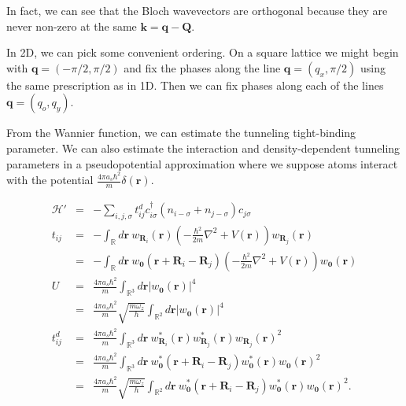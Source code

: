 \documentclass{article}
\theoremstyle{definition}
\begin{document}
 In fact, we can see that the Bloch wavevectors are orthogonal because they are never non-zero at the same $\mathbf{k} = \mathbf{q} - \mathbf{Q}$.
 
In 2D, we can pick some convenient ordering. On a square lattice we might begin with $\mathbf{q} = (-\pi/2, \pi/2)$ and fix the phases along the line $\mathbf{q} = (q_x, \pi/2)$ using the same prescription as in 1D. Then we can fix phases along each of the lines $\mathbf{q} = (q_o, q_y)$. 

From the Wannier function, we can estimate the tunneling tight-binding parameter. We can also estimate the interaction and density-dependent tunneling parameters in a pseudopotential approximation where we suppose atoms interact with the potential $\frac{4\pi a_s \hbar^2}{m} \delta(\mathbf{r})$.

\begin{eqnarray}
\mathcal{H}' &=& - \sum_{i,j, \sigma} t^d_{ij} c_{i\sigma}^\dag (n_{i -\sigma} + n_{j -\sigma}) c_{j\sigma}\\
t_{ij} &=& -\int_\mathbb{R} d\mathbf{r} \ w_{\mathbf{R}_i}(\mathbf{r})\left(-\frac{\hbar^2}{2m} \nabla^2 + V(\mathbf{r}) \right) w_{\mathbf{R}_j}(\mathbf{r})\\
&=& -\int_\mathbb{R} d\mathbf{r} \ w_{\mathbf{0}}(\mathbf{r} + \mathbf{R}_i - \mathbf{R}_j)\left(-\frac{\hbar^2}{2m} \nabla^2 + V(\mathbf{r}) \right) w_{\mathbf{0}}(\mathbf{r})\\
U &=& \frac{4 \pi a_s \hbar^2}{m} \int_{\mathbb{R}^3} d\mathbf{r} \left| w_{\mathbf{0}}(\mathbf{r}) \right|^4\\
&=& \frac{4 \pi a_s \hbar^2}{m} \sqrt{\frac{m\omega_z}{h}} \int_{\mathbb{R}^2} d\mathbf{r} \left| w_{\mathbf{0}}(\mathbf{r}) \right|^4\\
t^d_{ij} &=& \frac{4 \pi a_s \hbar^2}{m} \int_{\mathbb{R}^3} d\mathbf{r} \ w^*_{\mathbf{R}_i}(\mathbf{r}) w^*_{\mathbf{R}_j}(\mathbf{r}) w_{\mathbf{R}_j}(\mathbf{r})^2\\
&=& \frac{4 \pi a_s \hbar^2}{m} \int_{\mathbb{R}^3} d\mathbf{r} \ w^*_{\mathbf{0}}(\mathbf{r} + \mathbf{R}_i - \mathbf{R}_j) w^*_{\mathbf{0}}(\mathbf{r}) w_{\mathbf{0}}(\mathbf{r})^2 \\
&=& \frac{4 \pi a_s \hbar^2}{m} \sqrt{\frac{m\omega_z}{h}} \int_{\mathbb{R}^2} d\mathbf{r} \ w^*_{\mathbf{0}}(\mathbf{r} + \mathbf{R}_i - \mathbf{R}_j) w^*_{\mathbf{0}}(\mathbf{r}) w_{\mathbf{0}}(\mathbf{r})^2.
\end{eqnarray}
\end{document}
